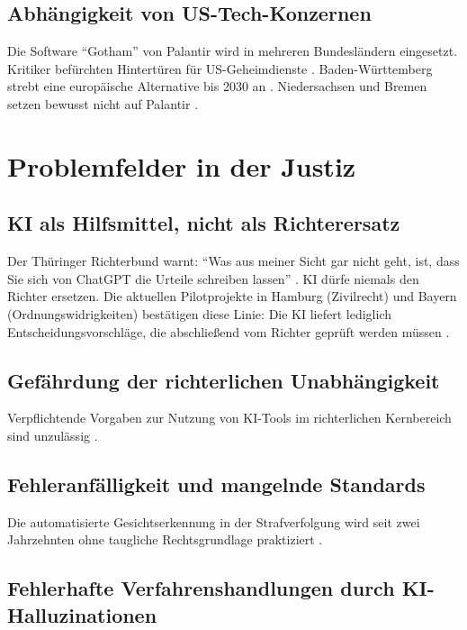\documentclass[12pt,a4paper]{article}
\begin{document}
	\subsection{Abhängigkeit von US-Tech-Konzernen}
	
	Die Software \enquote{Gotham} von Palantir wird in mehreren Bundesländern eingesetzt. Kritiker befürchten Hintertüren für US-Geheimdienste \cite{Focus2025}. Baden-Württemberg strebt eine europäische Alternative bis 2030 an \cite{FR2026}. Niedersachsen und Bremen setzen bewusst nicht auf Palantir \cite{Goslarsche2025}.
	
	\section{Problemfelder in der Justiz}
	
	\subsection{KI als Hilfsmittel, nicht als Richterersatz}
	
	Der Thüringer Richterbund warnt: \enquote{Was aus meiner Sicht gar nicht geht, ist, dass Sie sich von ChatGPT die Urteile schreiben lassen} \cite{SZ2025}. KI dürfe niemals den Richter ersetzen. Die aktuellen Pilotprojekte in Hamburg (Zivilrecht) und Bayern (Ordnungswidrigkeiten) bestätigen diese Linie: Die KI liefert lediglich Entscheidungsvorschläge, die abschließend vom Richter geprüft werden müssen \cite{LegalTech2025}.
	
	\subsection{Gefährdung der richterlichen Unabhängigkeit}
	
	Verpflichtende Vorgaben zur Nutzung von KI-Tools im richterlichen Kernbereich sind unzulässig \cite{Anwaltsblatt2025}.
	
	\subsection{Fehleranfälligkeit und mangelnde Standards}
	
	Die automatisierte Gesichtserkennung in der Strafverfolgung wird seit zwei Jahrzehnten ohne taugliche Rechtsgrundlage praktiziert \cite{Nomos2025}.
	
	\subsection{Fehlerhafte Verfahrenshandlungen durch KI-Halluzinationen}
	
\end{document}

